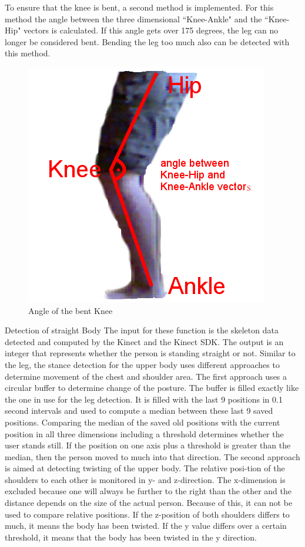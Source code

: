 To ensure that the knee is bent, a second method is implemented. For this method the angle between the three dimensional ``Knee-Ankle" and the ``Knee-Hip" vectors is calculated. If this angle gets over 175 degrees, the leg can no longer be considered bent. Bending the leg too much also can be detected with this method.
\begin{figure}
\centering
\includegraphics[width=0.7\linewidth]{figures/3-IMR/rehabilitationKneeAngle}
\caption{Angle of the bent Knee}
\label{fig:rehabilitationKneeAngle}
\end{figure}
Detection of straight Body 
The input for these function is the skeleton data detected and computed by the Kinect and the Kinect SDK. The output is an integer that represents whether the person is standing straight or not. Similar to the leg, the stance detection for the upper body uses different approaches to determine movement of the chest and shoulder area.
The first approach uses a circular buffer to determine change of the posture. The buffer is filled exactly like the one in use for the leg detection. It is filled with the last 9 positions in 0.1 second intervals and used to compute a median between these last 9 saved positions. Comparing the median of the saved old positions with the current position in all three dimensions including a threshold determines whether the user stands still. If the position on one axis plus a threshold is greater than the median, then the person moved to much into that direction.
The second approach is aimed at detecting twisting of the upper body. The relative posi-tion of the shoulders to each other is monitored in y- and z-direction. The x-dimension is excluded because one will always be further to the right than the other and the distance depends on the size of the actual person. Because of this, it can not be used to compare relative positions. If the z-position of both shoulders differs to much, it means the body has been twisted. If the y value differs over a certain threshold, it means that the body has been twisted in the y direction.
